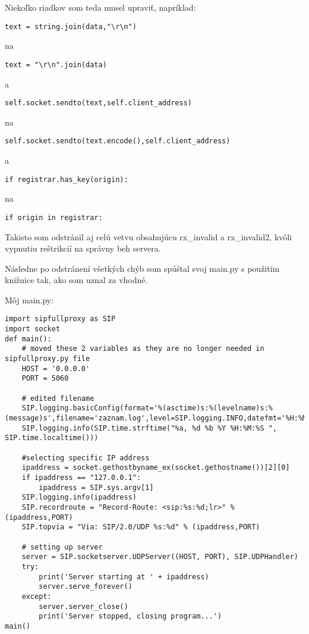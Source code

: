\documentclass[10pt,oneside,slovak,a4paper]{article}
\begin{document}
Niekoľko riadkov som teda musel upraviť, napríklad:
\begin{lstlisting}
text = string.join(data,"\r\n")
\end{lstlisting}
na
\begin{lstlisting}
text = "\r\n".join(data)
\end{lstlisting}

a

\begin{lstlisting}
self.socket.sendto(text,self.client_address)
\end{lstlisting}
na
\begin{lstlisting}
self.socket.sendto(text.encode(),self.client_address)
\end{lstlisting}

a

\begin{lstlisting}
if registrar.has_key(origin):
\end{lstlisting}
na
\begin{lstlisting}
if origin in registrar:
\end{lstlisting}

Takisto som odstránil aj celú vetvu obsahujúcu rx\_invalid a rx\_invalid2, kvôli vypnutiu reštrikcií na správny beh servera.



Následne po odstránení všetkých chýb som spúštal svoj main.py s použitím knižnice tak, ako som uznal za vhodné.

Môj main.py:
\begin{lstlisting}
import sipfullproxy as SIP
import socket
def main():
    # moved these 2 variables as they are no longer needed in sipfullproxy.py file
    HOST = '0.0.0.0'
    PORT = 5060

    # edited filename
    SIP.logging.basicConfig(format='%(asctime)s:%(levelname)s:%(message)s',filename='zaznam.log',level=SIP.logging.INFO,datefmt='%H:%M:%S')
    SIP.logging.info(SIP.time.strftime("%a, %d %b %Y %H:%M:%S ", SIP.time.localtime()))

    #selecting specific IP address
    ipaddress = socket.gethostbyname_ex(socket.gethostname())[2][0]
    if ipaddress == "127.0.0.1":
        ipaddress = SIP.sys.argv[1]
    SIP.logging.info(ipaddress)
    SIP.recordroute = "Record-Route: <sip:%s:%d;lr>" % (ipaddress,PORT)
    SIP.topvia = "Via: SIP/2.0/UDP %s:%d" % (ipaddress,PORT)

    # setting up server
    server = SIP.socketserver.UDPServer((HOST, PORT), SIP.UDPHandler)
    try:
        print('Server starting at ' + ipaddress) 
        server.serve_forever()
    except:
        server.server_close()
        print('Server stopped, closing program...')
main()
\end{lstlisting}
\end{document}
